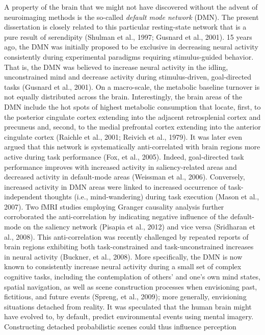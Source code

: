 \documentclass[authoryear,review,3p]{elsarticle}
\begin{document}
A property of the brain that we might not have
discovered without the advent of neuroimaging methods is the
so-called \textit{default mode network} (DMN).
The present dissertation is closely related
to this particular resting-state network
that is a pure result of serendipity
(Shulman et al., 1997; Gusnard et al., 2001).
%
15 years ago,
the DMN was initially proposed to be exclusive
in decreasing neural activity consistently during experimental
paradigms requiring stimulus-guided behavior.
That is, the DMN was believed to
increase neural activity in the idling, unconstrained mind and decrease activity
during stimulus-driven, goal-directed tasks (Gusnard et al., 2001).
On a macro-scale, the metabolic baseline turnover is not equally
distributed across the brain.
Interestingly, the brain areas of the DMN include the hot spots of
highest metabolic consumption that locate, first, to the
posterior cingulate cortex extending into the adjacent retrosplenial
cortex and precuneus and, second, to the medial prefrontal cortex
extending into the anterior cingulate cortex
(Raichle et al., 2001; Reivich et al., 1979).
It was later even argued that this network is systematically anti-correlated
with brain regions more active during task performance (Fox, et al., 2005).
Indeed, goal-directed task performance improves with increased activity
in saliency-related areas and decreased activity in default-mode
areas (Weissman et al., 2006). Conversely, increased activity in DMN areas
were linked to increased occurrence of
task-independent thoughts (i.e., mind-wandering) during task
execution (Mason et al., 2007). Two fMRI studies employing Granger causality
analysis further corroborated the anti-correlation by indicating negative
influence of the default-mode on the saliency
network (Pisapia et al., 2012) and vice versa (Sridharan et al., 2008).
This anti-correlation was recently challenged by repeated reports of brain regions
exhibiting both task-constrained and task-unconstrained increases in
neural activity (Buckner, et al., 2008). More specifically,
the DMN is now known to consistently increase neural activity
during a small set of complex cognitive tasks, including
the contemplation of others’ and one’s own mind states,
spatial navigation,
as well as scene construction processes
when envisioning past, fictitious, and future events
(Spreng, et al., 2009);
more generally, envisioning situations detached from reality.
%
It was speculated that the human brain might have evolved to,
by default, predict environmental events using mental imagery.
Constructing detached probabilistic scenes could thus influence perception
\end{document}
